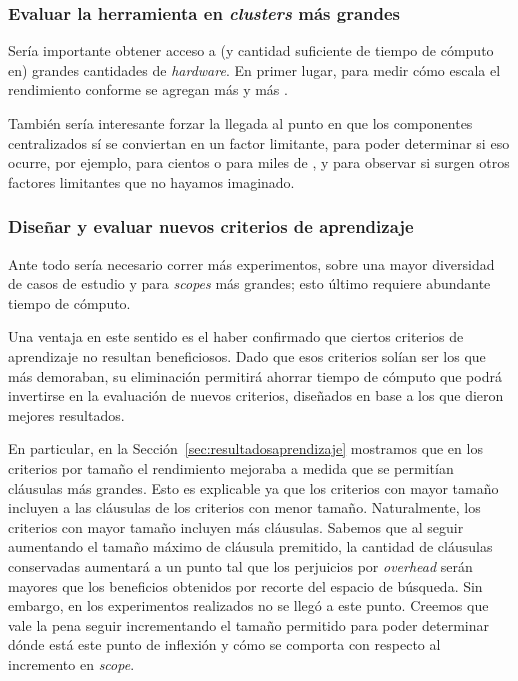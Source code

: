 \subsubsection{Evaluar la herramienta en \emph{clusters} más grandes}

Sería importante obtener acceso a (y cantidad suficiente de tiempo de cómputo
en) grandes cantidades de \emph{hardware}. En primer lugar, para medir cómo
escala el rendimiento conforme se agregan más y más \ws.

También sería interesante forzar la llegada al punto en que los componentes
centralizados sí se conviertan en un factor limitante, para poder determinar
si eso ocurre, por ejemplo, para cientos o para miles de \ws, y para observar
si surgen otros factores limitantes que no hayamos imaginado.


\subsubsection{Diseñar y evaluar nuevos criterios de aprendizaje}

Ante todo sería necesario correr más experimentos, sobre una mayor diversidad
de casos de estudio y para \emph{scopes} más grandes; esto último requiere
abundante tiempo de cómputo.

Una ventaja en este sentido es el haber confirmado que ciertos criterios de
aprendizaje no resultan beneficiosos. Dado que esos criterios solían ser los
que más demoraban, su eliminación permitirá ahorrar tiempo de cómputo que
podrá invertirse en la evaluación de nuevos criterios, diseñados en base a los
que dieron mejores resultados.

En particular, en la Sección~\ref{sec:resultadosaprendizaje} mostramos que en
los criterios por tamaño el rendimiento mejoraba a medida que se permitían
cláusulas más grandes. Esto es explicable ya que los criterios con mayor
tamaño incluyen a las cláusulas de los criterios con menor tamaño.
Naturalmente, los criterios con mayor tamaño incluyen más cláusulas. Sabemos
que al seguir aumentando el tamaño máximo de cláusula premitido, la cantidad
de cláusulas conservadas aumentará a un punto tal que los perjuicios por
\emph{overhead} serán mayores que los beneficios obtenidos por recorte del
espacio de búsqueda. Sin embargo, en los experimentos realizados no se llegó a
este punto. Creemos que vale la pena seguir incrementando el tamaño permitido
para poder determinar dónde está este punto de inflexión y cómo se comporta
con respecto al incremento en \emph{scope}.


